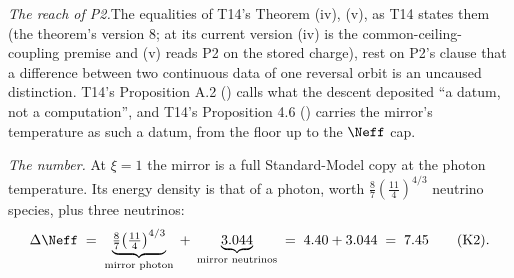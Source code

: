 \textit{The reach of P2.}\enspace The equalities of T14's Theorem (iv), (v), as T14 states them (the theorem's version 8; at its current version (iv) is the common-ceiling-coupling premise and (v) reads P2 on the stored charge), rest on P2's clause that a difference between two continuous data of one reversal orbit is an uncaused distinction. T14's Proposition A.2 () calls what the descent deposited ``a datum, not a computation'', and T14's Proposition 4.6 () carries the mirror's temperature as such a datum, from the floor up to the $\Neff$ cap.



\emph{The number.}  At $\xi = 1$ the mirror is a full Standard-Model copy at the photon temperature. Its energy density is that of a photon, worth $\tfrac{8}{7}(\tfrac{11}{4})^{4/3}$ neutrino species, plus three neutrinos:
\[
\Delta\Neff \;=\; \underbrace{\tfrac{8}{7}\bigl(\tfrac{11}{4}\bigr)^{4/3}}_{\text{mirror photon}} \;+\; \underbrace{3.044}_{\text{mirror neutrinos}} \;=\; 4.40 + 3.044 \;=\; 7.45 \qquad \text{(K2)}.
\]
